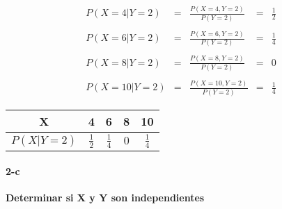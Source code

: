 \documentclass[12pt]{article}
\begin{document}
    \begin{equation*} 
        \begin{array}{rcccc}
            P\left(X = 4 | Y =2 \right) & = & \displaystyle \frac{P\left(X=4 , Y=2\right)}{P\left(Y =2\right)} & = & \displaystyle \frac{1}{2}
            \\
            \\
            P\left(X = 6 | Y =2 \right) & = & \displaystyle \frac{P\left(X=6 , Y=2\right)}{P\left(Y =2\right)} & = & \displaystyle \frac{1}{4}
            \\
            \\
            P\left(X = 8 | Y =2 \right) & = & \displaystyle \frac{P\left(X=8 , Y=2\right)}{P\left(Y =2\right)} & = & 0
            \\
            \\
            P\left(X = 10 | Y =2 \right) & = & \displaystyle \frac{P\left(X=10 , Y=2\right)}{P\left(Y =2\right)} & = & \displaystyle \frac{1}{4}
        \end{array}
    \end{equation*}

 
    \begin{table}[h]  
        \begin{center}
            \renewcommand{\arraystretch}{1.5}
            \begin{tabular}{|c|c|c|c|c|}
                \hline
                X & 4 & 6 & 8 & 10 
                \\
                \hline
                $\displaystyle P \left(X|Y=2\right)$ & $ \frac{1}{2}$ & $ \frac{1}{4}$ & $0$ & $ \frac{1}{4}$
                \\
                \hline 
            \end{tabular}
        \end{center}
    \end{table}  
        



    \paragraph*{2-c }{\bf  Determinar si X y Y  son independientes} 
\end{document}

